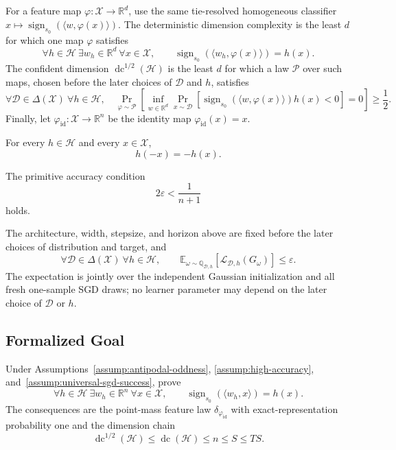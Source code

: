 For a feature map $\varphi:\mathcal X\to\mathbb R^d$, use the same
tie-resolved homogeneous classifier
$x\mapsto\operatorname{sign}_{s_0}(\langle w,\varphi(x)\rangle)$.  The
deterministic dimension complexity is the least $d$ for which one map
$\varphi$ satisfies
\[
\forall h\in\mathcal H\ \exists w_h\in\mathbb R^d\ \forall x\in\mathcal X,
\qquad
\operatorname{sign}_{s_0}(\langle w_h,\varphi(x)\rangle)=h(x).
\]
The confident dimension $\operatorname{dc}^{1/2}(\mathcal H)$ is the least
$d$ for which a law $\mathcal P$ over such maps, chosen before the later
choices of $\mathcal D$ and $h$, satisfies
\[
\forall\mathcal D\in\Delta(\mathcal X)\ \forall h\in\mathcal H,
\quad
\Pr_{\varphi\sim\mathcal P}\!\left[
\inf_{w\in\mathbb R^d}
\Pr_{x\sim\mathcal D}\!\left[
\operatorname{sign}_{s_0}(\langle w,\varphi(x)\rangle)h(x)<0
\right]=0\right]\geq\frac12.
\]
Finally, let $\varphi_{\mathrm{id}}:\mathcal X\to\mathbb R^n$ be the
identity map $\varphi_{\mathrm{id}}(x)=x$.

\begin{assumption}
\label{assump:antipodal-oddness}
For every $h\in\mathcal H$ and every $x\in\mathcal X$,
\[
h(-x)=-h(x).
\]
\end{assumption}

\begin{assumption}
\label{assump:high-accuracy}
The primitive accuracy condition
\[
2\varepsilon<\frac{1}{n+1}
\]
holds.
\end{assumption}

\begin{assumption}
\label{assump:universal-sgd-success}
The architecture, width, stepsize, and horizon above are fixed before the
later choices of distribution and target, and
\[
\forall\mathcal D\in\Delta(\mathcal X)\ \forall h\in\mathcal H,
\qquad
\mathbb E_{\omega\sim\mathbb Q_{\mathcal D,h}}
 \left[\mathcal L_{\mathcal D,h}(G_\omega)\right]\leq\varepsilon.
\]
The expectation is jointly over the independent Gaussian initialization and
all fresh one-sample SGD draws; no learner parameter may depend on the later
choice of $\mathcal D$ or $h$.
\end{assumption}

\subsection{Formalized Goal}

Under Assumptions~\ref{assump:antipodal-oddness},
\ref{assump:high-accuracy}, and~\ref{assump:universal-sgd-success}, prove
\[
\forall h\in\mathcal H\ \exists w_h\in\mathbb R^n\ \forall x\in\mathcal X,
\qquad
\operatorname{sign}_{s_0}(\langle w_h,x\rangle)=h(x).
\]
The consequences are the point-mass feature law
$\delta_{\varphi_{\mathrm{id}}}$ with exact-representation probability one
and the dimension chain
\[
\operatorname{dc}^{1/2}(\mathcal H)
\leq\operatorname{dc}(\mathcal H)\leq n\leq S\leq TS.
\]
